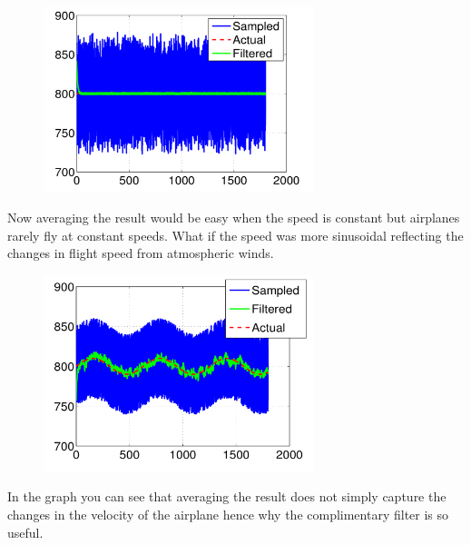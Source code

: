 \begin{enumerate}
      \begin{figure}[H]
        \begin{center}
          \includegraphics[height=0.5\textwidth,width=0.7\textwidth]{Graphics/Airplane_Sensor_Constant}
        \end{center}
      \end{figure}

      Now averaging the result would be easy when the speed is
      constant but airplanes rarely fly at constant speeds. What if
      the speed was more sinusoidal reflecting the changes in flight
      speed from atmospheric winds.

      \begin{figure}[H]
        \begin{center}
          \includegraphics[height=0.5\textwidth,width=0.7\textwidth]{Graphics/Airplane_Sensor_Variable}
        \end{center}
      \end{figure}

      In the graph you can see that averaging the result does not
      simply capture the changes in the velocity of the airplane hence
      why the complimentary filter is so useful.
    
\end{enumerate}


